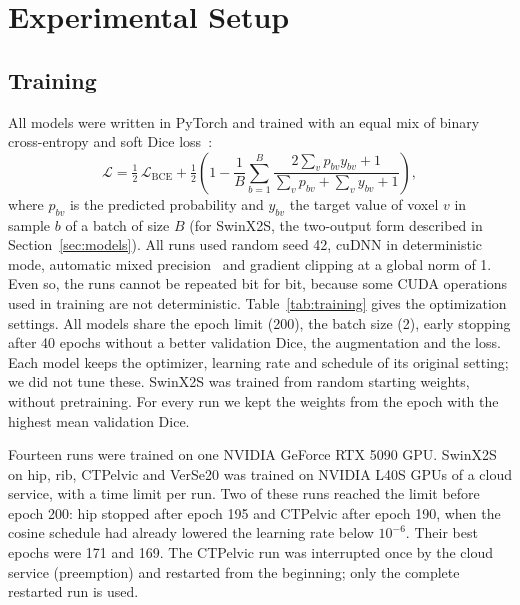 \documentclass[11pt]{article}
\begin{document}
\section{Experimental Setup}\label{sec:setup}

\subsection{Training}
All models were written in PyTorch and trained with an equal mix of binary cross-entropy and soft Dice loss~\cite{milletari2016}:
\begin{equation}
\mathcal{L}=\tfrac12\,\mathcal{L}_{\mathrm{BCE}}+\tfrac12\left(1-\frac{1}{B}\sum_{b=1}^{B}\frac{2\sum_v p_{bv}y_{bv}+1}{\sum_v p_{bv}+\sum_v y_{bv}+1}\right),
\label{eq:loss}
\end{equation}
where $p_{bv}$ is the predicted probability and $y_{bv}$ the target value of voxel $v$ in sample $b$ of a batch of size $B$ (for SwinX2S, the two-output form described in Section~\ref{sec:models}). All runs used random seed 42, cuDNN in deterministic mode, automatic mixed precision~\cite{micikevicius2018} and gradient clipping at a global norm of 1. Even so, the runs cannot be repeated bit for bit, because some CUDA operations used in training are not deterministic. Table~\ref{tab:training} gives the optimization settings. All models share the epoch limit (200), the batch size (2), early stopping after 40 epochs without a better validation Dice, the augmentation and the loss. Each model keeps the optimizer, learning rate and schedule of its original setting; we did not tune these. SwinX2S was trained from random starting weights, without pretraining. For every run we kept the weights from the epoch with the highest mean validation Dice.

Fourteen runs were trained on one NVIDIA GeForce RTX 5090 GPU. SwinX2S on hip, rib, CTPelvic and VerSe20 was trained on NVIDIA L40S GPUs of a cloud service, with a time limit per run. Two of these runs reached the limit before epoch 200: hip stopped after epoch 195 and CTPelvic after epoch 190, when the cosine schedule had already lowered the learning rate below $10^{-6}$. Their best epochs were 171 and 169. The CTPelvic run was interrupted once by the cloud service (preemption) and restarted from the beginning; only the complete restarted run is used.
\end{document}
